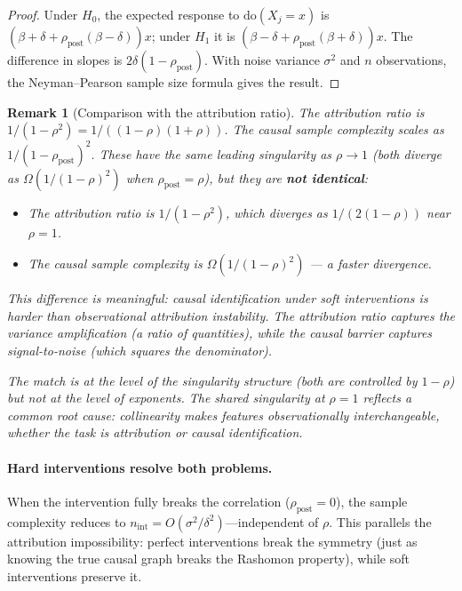 \documentclass{article}
\newtheorem{remark}[theorem]{Remark}
\begin{document}
\begin{proof}
Under $H_0$, the expected response to $\text{do}(X_j = x)$ is $(\beta + \delta + \rho_{\mathrm{post}}(\beta - \delta))x$; under $H_1$ it is $(\beta - \delta + \rho_{\mathrm{post}}(\beta + \delta))x$. The difference in slopes is $2\delta(1 - \rho_{\mathrm{post}})$. With noise variance $\sigma^2$ and $n$ observations, the Neyman--Pearson sample size formula gives the result.
\end{proof}

\begin{remark}[Comparison with the attribution ratio]
The attribution ratio is $1/(1-\rho^2) = 1/((1-\rho)(1+\rho))$.
The causal sample complexity scales as $1/(1-\rho_{\mathrm{post}})^2$.
These have the same leading singularity as $\rho \to 1$ (both
diverge as $\Omega(1/(1-\rho)^2)$ when $\rho_{\mathrm{post}} = \rho$),
but they are \textbf{not identical}:
\begin{itemize}
    \item The attribution ratio is $1/(1-\rho^2)$, which diverges
      as $1/(2(1-\rho))$ near $\rho = 1$.
    \item The causal sample complexity is $\Omega(1/(1-\rho)^2)$
      --- a \emph{faster} divergence.
\end{itemize}
This difference is meaningful: causal identification under soft
interventions is \emph{harder} than observational attribution
instability. The attribution ratio captures the \emph{variance
amplification} (a ratio of quantities), while the causal barrier
captures \emph{signal-to-noise} (which squares the denominator).

The match is at the level of the singularity structure (both are
controlled by $1-\rho$) but not at the level of exponents.
The shared singularity at $\rho = 1$ reflects a common root cause:
collinearity makes features observationally interchangeable, whether
the task is attribution or causal identification.
\end{remark}

\paragraph{Hard interventions resolve both problems.}
When the intervention fully breaks the correlation
($\rho_{\mathrm{post}} = 0$), the sample complexity reduces to
$n_{\mathrm{int}} = O(\sigma^2/\delta^2)$---independent of $\rho$.
This parallels the attribution impossibility: perfect interventions
break the symmetry (just as knowing the true causal graph breaks
the Rashomon property), while soft interventions preserve it.
\end{document}
